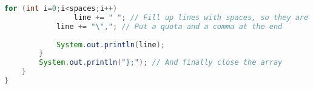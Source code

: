 \begin{lstlisting}[language=Java]
			for (int i=0;i<spaces;i++)
				line += " "; // Fill up lines with spaces, so they are all the same length
			line += "\","; // Put a quota and a comma at the end
			
			System.out.println(line);
		}
		System.out.println("};"); // And finally close the array
	}
}
\end{lstlisting}
